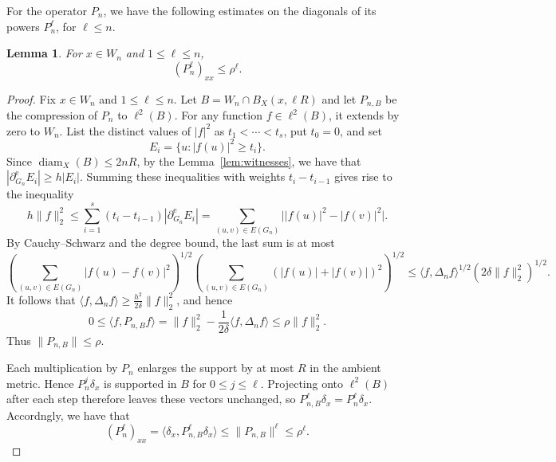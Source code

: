 \documentclass[11pt,a4paper]{article}
\newtheorem{lemma}[theorem]{Lemma}
\theoremstyle{definition}\newtheorem{definition}[theorem]{Definition}
\theoremstyle{remark}\newtheorem{remark}[theorem]{Remark}
\begin{document}
For the operator $P_n$, we have the following estimates on the diagonals of its powers $P_n^{\ell}$, for $\ell\leq n$.

\begin{lemma}\label{lem:local-matrix-bound}
For $x\in W_n$ and $1\le \ell\le n$,
\begin{equation}\label{eq:local-matrix-bound}
(P_n^\ell)_{xx}\le\rho^\ell.
\end{equation}
\end{lemma}
\begin{proof}


Fix $x\in W_n$ and $1\le\ell\le n$. Let
$B=W_n\cap B_X(x,\ell R)$ and let $P_{n,B}$ be the compression
of $P_n$ to $\ell^2(B)$. For any function $f\in\ell^2(B)$, it extends by zero to $W_n$.
List the distinct values of $|f|^2$ as
$t_1<\cdots<t_s$, put $t_0=0$, and set
$$E_i=\{u:|f(u)|^2\ge t_i\}.$$ 
Since $\operatorname{diam}_X(B)\le 2nR$, by the Lemma~\ref{lem:witnesses}, we have that $|\partial_{G_n}^{\mathrm e}E_i|\ge h|E_i|$. 
Summing
these inequalities with weights $t_i-t_{i-1}$ gives rise to the inequality
$$
h\|f\|_2^2
\le \sum_{i=1}^s(t_i-t_{i-1})|\partial_{G_n}^{\mathrm e}E_i|
= \sum_{(u,v)\in E(G_n)}
  \bigl||f(u)|^2-|f(v)|^2\bigr|.
$$
By Cauchy--Schwarz and the degree bound, the last sum is at most
$$
\left(\sum_{(u,v)\in E(G_n)}|f(u)-f(v)|^2\right)^{1/2}
\left(\sum_{(u,v)\in E(G_n)}(|f(u)|+|f(v)|)^2\right)^{1/2}
\le \langle f,\Delta_n f\rangle^{1/2}
    (2\delta\|f\|_2^2)^{1/2}.
$$
It follows that $\langle f,\Delta_n f\rangle
\ge \frac{h^2}{2\delta}\|f\|_2^2$, and hence
$$
0\le \langle f,P_{n,B}f\rangle
=\|f\|_2^2-\frac{1}{2\delta}\langle f,\Delta_n f\rangle
\le \rho\|f\|_2^2.
$$
Thus $\|P_{n,B}\|\le\rho$.

Each multiplication by $P_n$ enlarges the support by at most $R$
in the ambient metric. Hence $P_n^j\delta_x$ is supported in $B$
for $0\le j\le\ell$. Projecting onto $\ell^2(B)$ after each step
therefore leaves these vectors unchanged, so
$P_{n,B}^{\ell}\delta_x=P_n^{\ell}\delta_x$. Accordngly, we have that
$$
(P_n^\ell)_{xx}
=\langle\delta_x,P_{n,B}^{\ell}\delta_x\rangle
\le \|P_{n,B}\|^\ell
\le \rho^\ell.
$$
\end{proof}
\end{document}

